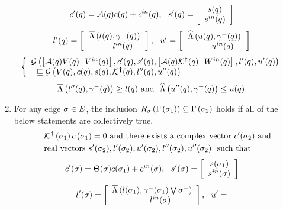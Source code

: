 \begin{lemma}
\begin{enumerate}
\begin{align}
& c^\prime(q) = \mathcal{A}(q)c(q)+c^{in}(q),~~s^\prime(q) =
  \left[\begin{array}{c}{s(q)}\\{s^{in}(q)} \end{array}\right]
\end{align}
\vspace{-1.5em}
\begin{align}
& l^\prime(q) =
  \left[\begin{array}{c}{\overline{\Lambda}\left(l(q),\gamma^-(q)\right)}\\{~~~~~~~~~l^{in}(q)~~~} \end{array}\right],~~u^\prime
  =
  \left[\begin{array}{c}{\widehat{\Lambda}\left(u(q),\gamma^+(q)\right)}\\{~~~~~~~~~u^{in}(q)~~~} \end{array}\right]
\end{align}
\vspace{-1.5em}
\begin{align}
& \left\{\begin{array}{l}{\mathcal{G}\left(\left[\mathcal{A}(q)V(q)~~V^{in}(q)\right],c^\prime(q),s^\prime(q),\left[\mathcal{A}(q)\mathcal{K}^{\bm{\dagger}}(q)~~W^{in}(q)\right],l^\prime(q),u^\prime(q)\right)}\\{~~\sqsubseteq
   \mathcal{G}\left(V(q),c(q),s(q),\mathcal{K}^{\bm{\dagger}}(q),l^{\prime\prime}(q),u^{\prime\prime}(q)\right)} \end{array}\right.
\end{align}
\vspace{-1.5em}
\begin{align}
& \overline{\Lambda}\left(l^{\prime\prime}(q),\gamma^-(q)\right)\geq l(q)~\text{and}~~
\widehat{\Lambda}\left(u^{\prime\prime}(q),\gamma^+(q)\right)\leq u(q).
 \end{align}
\item For any edge $\sigma\in E$, the inclusion
  $R_{\sigma}\left(\Gamma\left(\sigma_{1}\right)\right)
  \subseteq \Gamma\left(\sigma_{2}\right)$ holds if 
  all of the below statements are collectively true.
\begin{align}~\label{eqn:edgeinv}
\begin{split}
& \mathcal{K}^{\bm{\dagger}}\left(\sigma_{1}\right)c\left(\sigma_{1}\right) =
  0~\text{and there exists a complex
  vector}~c^\prime(\sigma_{2})~\text{and}\\
& \text{real
    vectors}~s^\prime(\sigma_{2}),l^\prime(\sigma_{2}),u^\prime(\sigma_{2}),l^{\prime\prime}(\sigma_{2}),u^{\prime\prime}(\sigma_{2})~~\text{such
  that}
\end{split}
\end{align}
\vspace{-1.5em}
\begin{align}
& c^\prime(\sigma) = \Theta(\sigma)c(\sigma_{1})+c^{in}(\sigma),~~s^\prime(\sigma) =
  \left[\begin{array}{c}{s(\sigma_{1})}\\{s^{in}(\sigma)} \end{array}\right]
\end{align}
\vspace{-1.5em}
\begin{align}
& l^\pr(\edge) =
  \ColumnJoin{\maxaffine{l(\preloc{\edge})}{\stay^-(\preloc{\edge})\bigvee\loweredgebound{\edge}}}{~~~~~~~~~l^{in}(\edge)~~~},~~u^\pr =

\end{align}
\end{enumerate}
\end{lemma}
